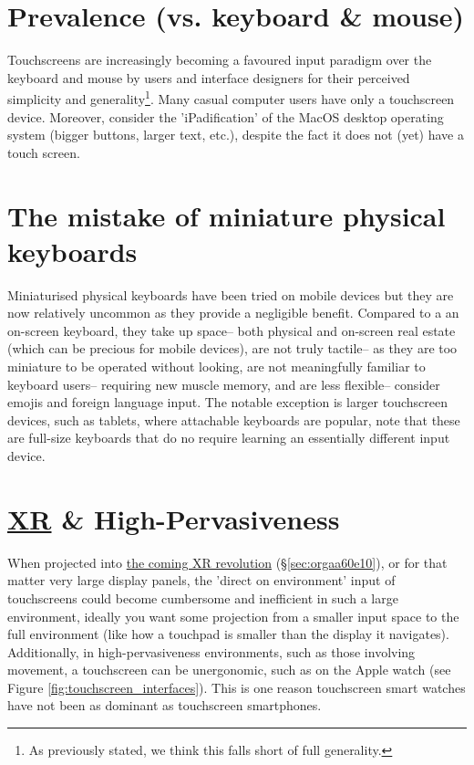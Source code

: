 \documentclass[logo,bsc,singlespacing,parskip]{infthesis}
\begin{document}
\section{Prevalence (vs. keyboard \& mouse)}
\label{sec:orge744e5b}
Touchscreens are increasingly becoming a favoured input paradigm over the keyboard and mouse by users and interface designers for their perceived simplicity and generality\footnote{As previously stated, we think this falls short of full generality.}.
Many casual computer users have only a touchscreen device.
Moreover, consider the 'iPadification' of the MacOS desktop operating system (bigger buttons, larger text, etc.), despite the fact it does not (yet) have a touch screen.

\section{The mistake of miniature physical keyboards}
\label{sec:org9e98ac0}
Miniaturised physical keyboards have been tried on mobile devices but they are now relatively uncommon as they provide a negligible benefit.
Compared to a an on-screen keyboard, they take up space-- both physical and on-screen real estate (which can be precious for mobile devices), are not truly tactile-- as they are too miniature to be operated without looking, are not meaningfully familiar to keyboard users-- requiring new muscle memory, and are less flexible-- consider emojis and foreign language input.
The notable exception is larger touchscreen devices, such as tablets, where attachable keyboards are popular, note that these are full-size keyboards that do no require learning an essentially different input device.

\section{\hyperref[org88b0f70]{XR} \& High-Pervasiveness}
\label{sec:org15d7ce7}
When projected into \hyperref[sec:orgaa60e10]{the coming XR revolution} (\S \ref{sec:orgaa60e10}), or for that matter very large display panels, the 'direct on environment' input of touchscreens could become cumbersome and inefficient in such a large environment, ideally you want some projection from a smaller input space to the full environment (like how a touchpad is smaller than the display it navigates).
Additionally, in high-pervasiveness environments, such as those involving movement, a touchscreen can be unergonomic, such as on the Apple watch (see Figure \ref{fig:touchscreen_interfaces}).
This is one reason touchscreen smart watches have not been as dominant as touchscreen smartphones.
\end{document}
